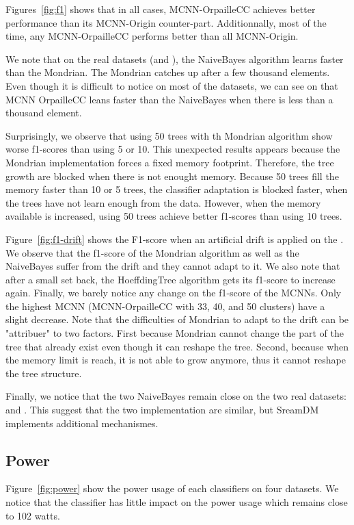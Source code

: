 Figures~\ref{fig:f1} shows that in all cases, MCNN-OrpailleCC achieves
better performance than its MCNN-Origin counter-part. Additionnally, most of
the time, any MCNN-OrpailleCC performs better than all MCNN-Origin.

We note that on the real datasets (\banosdataset and \recofitdataset), the
NaiveBayes algorithm learns faster than the Mondrian. The Mondrian catches up
after a few thousand elements. Even though it is difficult to notice on most of
the datasets, we can see on \banosdataset that MCNN OrpailleCC leans faster
than the NaiveBayes when there is less than a thousand element.

Surprisingly, we observe that using 50 trees with th Mondrian algorithm show worse
f1-scores than using 5 or 10. This unexpected results appears because the
Mondrian implementation forces a fixed memory footprint. Therefore, the tree
growth are blocked when there is not enought memory. Because 50 trees fill the
memory faster than 10 or 5 trees, the classifier adaptation is blocked faster,
when the trees have not learn enough from the data. However, when the memory
available is increased, using 50 trees achieve better f1-scores than using 10
trees.

Figure~\ref{fig:f1-drift} shows the F1-score when an artificial drift is
applied on the \banosdataset. We observe that the f1-score of the Mondrian
algorithm as well as the NaiveBayes suffer from the drift and they cannot adapt
to it. We also note that after a small set back, the HoeffdingTree algorithm
gets its f1-score to increase again. Finally, we barely notice any change on
the f1-score of the MCNNs. Only the highest MCNN (MCNN-OrpailleCC with 33, 40,
and 50 clusters) have a slight decrease.
Note that the difficulties of Mondrian to adapt to the drift can be "attribuer"
to two factors. First because Mondrian cannot change the part of the tree that
already exist even though it can reshape the tree. Second, because when the
memory limit is reach, it is not able to grow anymore, thus it cannot reshape
the tree structure.

Finally, we notice that the two NaiveBayes remain close on the two real
datasets: \banosdataset and \recofitdataset. This suggest that the two
implementation are similar, but SreamDM implements additional mechanismes.


\subsection{Power}
Figure~\ref{fig:power} show the power usage of each classifiers on four
datasets. We notice that the classifier has little impact on the
power usage which remains close to 102 watts.

